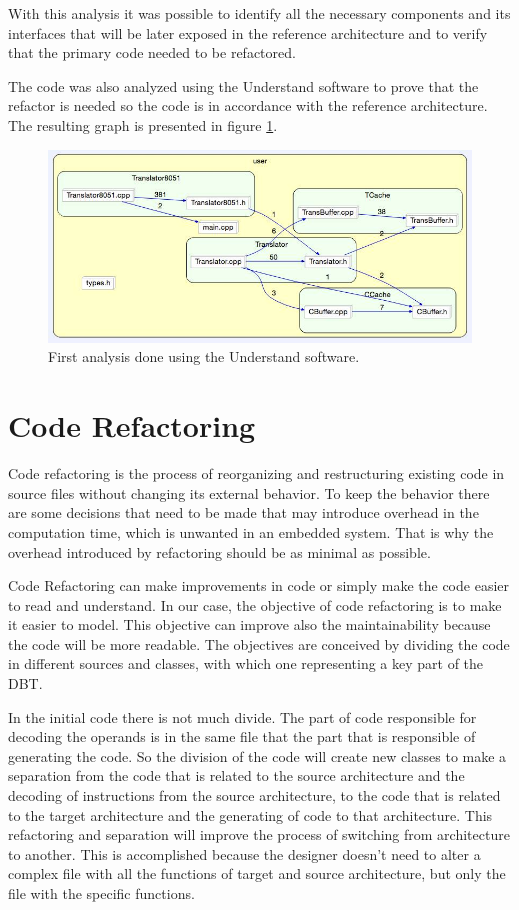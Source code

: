 \documentclass{report}
\begin{document}
	\par With this analysis it was possible to identify all the necessary components and its interfaces that will be later exposed in the reference architecture and to verify that the primary code needed to be refactored.

	\par The code was also analyzed using the Understand software to prove that the refactor is needed so the code is in accordance with the reference architecture. The resulting graph is presented in figure \ref{fig:understand1}.
	
	\begin{figure} [H]
		\centering
		\includegraphics[width=0.6\linewidth]{Images/refactor1.jpg}
		\caption{First analysis done using the Understand software.}
		\label{fig:understand1}
	\end{figure}

	\section{Code Refactoring}
	Code refactoring is the process of reorganizing and restructuring existing code in source files without changing its external behavior. To keep the behavior there are some decisions that need to be made that may introduce overhead in the computation time, which is unwanted in an embedded system. That is why the overhead introduced by refactoring should be as minimal as possible.
	
	Code Refactoring can make improvements in code or simply make the code easier to read and understand.
	In our case, the objective of code refactoring is to make it easier to model. This objective can improve also the maintainability because the code will be more readable. The objectives are conceived by dividing the code in different sources and classes, with which one representing a key part of the DBT.
	
	In the initial code there is not much divide. The part of code responsible for decoding the operands is in the same file that the part that is responsible of generating the code. So the division of the code will create new classes to make a separation from the code that is related to the source architecture and the decoding of instructions from the source architecture, to the code that is related to the target architecture and the generating of code to that architecture.
	This refactoring and separation will improve the process of switching from architecture to another. This is accomplished because the designer doesn't need to alter a complex file with all the functions of target and source architecture, but only the file with the specific functions. 
	
\end{document}
